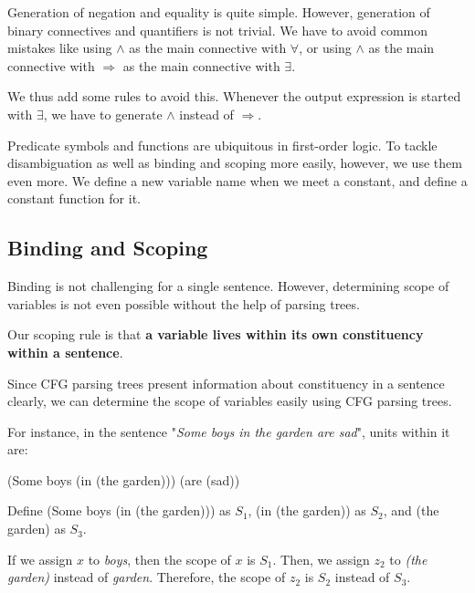 \documentclass{article}
\begin{document}
{{		Generation of negation and equality is quite simple. However, generation of binary connectives and quantifiers is not trivial. We have to avoid common mistakes like using $\wedge $ as the main connective with $\forall $, or using $\wedge $ as the main connective with $\Rightarrow $ as the main connective with $\exists $. 

		We thus add some rules to avoid this. Whenever the output expression is started with $\exists $, we have to generate $\wedge $ instead of $\Rightarrow$. 

		Predicate symbols and functions are ubiquitous in first-order logic. To tackle disambiguation as well as binding and scoping more easily, however, we use them even more. We define a new variable name when we meet a constant, and define a constant function for it. 
	}

	\subsection{Binding and Scoping}{

		Binding is not challenging for a single sentence. However, determining scope of variables is not even possible without the help of parsing trees. 


		Our scoping rule is that \textbf{a variable lives within its own constituency within a sentence}. 

		Since CFG parsing trees present information about constituency in a sentence clearly, we can determine the scope of variables easily using CFG parsing trees. 


		For instance, in the sentence "\emph{Some boys in the garden are sad}", units within it are: 

		(Some boys (in (the garden))) (are (sad))

		Define (Some boys (in (the garden))) as $S_1$, (in (the garden)) as $S_2 $, and (the garden) as $S_3 $. 

		If we assign $x$ to \emph{boys}, then the scope of $x$ is $S_1$. Then, we assign $z_2$ to \emph{(the garden)} instead of \emph{garden}. Therefore, the scope of $z_2$ is $S_2 $ instead of $S_3 $. 
	}
}
\end{document}
